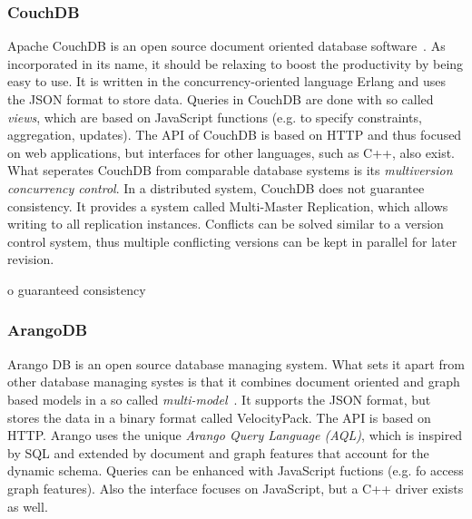 \subsubsection{CouchDB}
\label{sec:couchdb}
Apache CouchDB is an open source document oriented database
software~\cite{CouchDB,document-comparison}. As incorporated in its
name, it should be relaxing to boost the productivity by being easy to
use. It is written in the concurrency-oriented language Erlang and
uses the JSON format to store data. Queries in CouchDB are done with
so called \emph{views}, which are based on JavaScript functions
(e.g. to specify constraints, aggregation, updates). The API of
CouchDB is based on HTTP and thus focused on web applications, but
interfaces for other languages, such as C++, also exist. What
seperates CouchDB from comparable database systems is its
\emph{multiversion concurrency control}. In a distributed system,
CouchDB does not guarantee consistency. It provides a system called
Multi-Master Replication, which allows writing to all replication
instances.  Conflicts can be solved similar to a version control
system, thus multiple conflicting versions can be kept in parallel for
later revision.

  o guaranteed consistency

\subsubsection{ArangoDB}
\label{sec:arangodb}
Arango DB is an open source database managing system. What sets it
apart from other database managing systes is that it combines document
oriented and graph based models in a so called
\emph{multi-model}~\cite{arango-manual,arango}. It supports the JSON
format, but stores the data in a binary format called
VelocityPack. The API is based on HTTP. Arango uses the unique
\emph{Arango Query Language (AQL)}, which is inspired by SQL and
extended by document and graph features that account for the dynamic
schema. Queries can be enhanced with JavaScript fuctions (e.g. fo
access graph features). Also the interface focuses on JavaScript, but
a C++ driver exists as well.


